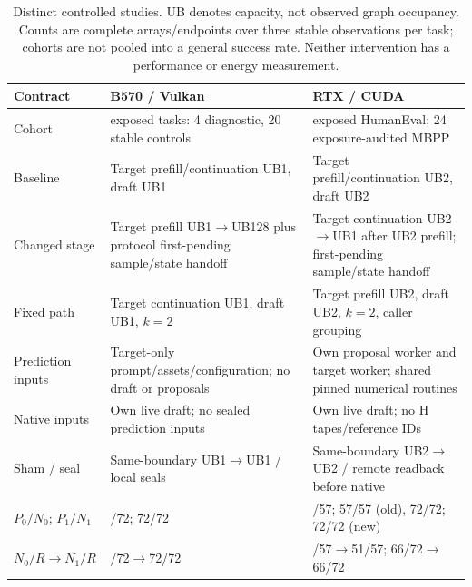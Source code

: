 \begin{table}[t]
\centering
\caption{Distinct controlled studies. UB denotes capacity, not observed graph occupancy. Counts are complete arrays/endpoints over three stable observations per task; cohorts are not pooled into a general success rate. Neither intervention has a performance or energy measurement.}
\label{tab:interventioncontracts}
\begin{tabular}{@{}>{\raggedright\arraybackslash}p{1.35in}>{\raggedright\arraybackslash}p{2.35in}>{\raggedright\arraybackslash}p{2.55in}@{}}
\toprule
Contract & B570 / Vulkan & RTX / CUDA \\
\midrule
Cohort & 24 exposed tasks: 4 diagnostic, 20 stable controls & 19 exposed HumanEval; 24 exposure-audited MBPP \\
Baseline & Target prefill/continuation UB1, draft UB1 & Target prefill/continuation UB2, draft UB2 \\
Changed stage & Target prefill UB1$\to$UB128 plus protocol first-pending sample/state handoff & Target continuation UB2$\to$UB1 after UB2 prefill; first-pending sample/state handoff \\
Fixed path & Target continuation UB1, draft UB1, $k=2$ & Target prefill UB2, draft UB2, $k=2$, caller grouping \\
Prediction inputs & Target-only prompt/assets/configuration; no draft or proposals & Own proposal worker and target worker; shared pinned numerical routines \\
Native inputs & Own live draft; no sealed prediction inputs & Own live draft; no H tapes/reference IDs \\
Sham / seal & Same-boundary UB1$\to$UB1 / local seals & Same-boundary UB2$\to$UB2 / remote readback before native \\
$P_0/N_0$; $P_1/N_1$ & 72/72; 72/72 & 57/57; 57/57 (old), 72/72; 72/72 (new) \\
$N_0/R\to N_1/R$ & 60/72$\to$72/72 & 51/57$\to$51/57; 66/72$\to$66/72 \\
\bottomrule
\end{tabular}
\end{table}
